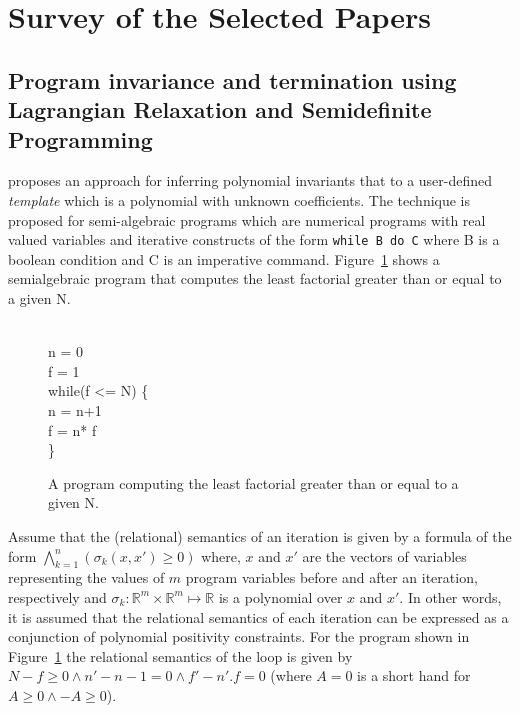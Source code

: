 \newcommand{\real}{\mathbb{R}}
\newcommand{\lmige}{\succcurlyeq}

\section{Survey of the Selected Papers}

\subsection{Program invariance and termination using Lagrangian Relaxation and Semidefinite Programming}

\cite{cousot:VMCAI05} proposes an approach for inferring polynomial invariants that 
to a user-defined \emph{template} which is a polynomial with unknown coefficients.
The technique is proposed for semi-algebraic programs which are numerical programs with real valued variables 
and iterative constructs of the form \texttt{while B do C} where B is a boolean condition 
and C is an imperative command. Figure~\ref{fig:SAprogram} shows a semialgebraic program that computes the least factorial greater than or equal to a given N.
%
\begin{figure}
\begin{myprogram}
\\
\pnl \>  n = 0 \\
\pnl \> f = 1 \\
\pnl \> while(f <= N) \{ \\
\pnl \> \> n = n+1 \\
\pnl \> \> f = n* f \\
\pnl \> \}
\end{myprogram}
\caption{A program computing the least factorial greater than or equal to a given N.} \label{fig:SAprogram}
\end{figure}
%
Assume that the (relational) semantics of an iteration is given by a formula of the form
$\bigwedge \limits_{k=1}^{n} (\sigma_k(x,x') \ge 0)$ where, $x$ and $x'$ are the vectors of
variables representing the values of $m$ program variables before and after an iteration, respectively 
and $\sigma_k : \real^m \times \real^m \mapsto \real$ is a polynomial over $x$ and $x'$. 
In other words, it is assumed that the relational semantics of each
iteration can be expressed as a conjunction of polynomial positivity constraints.
For the program shown in Figure~\ref{fig:SAprogram} the relational semantics of the 
loop is given by $N-f \ge 0 \wedge n' -n -1 = 0 \wedge f' - n'.f = 0$ (where 
$A = 0$ is a short hand for $A \ge 0 \wedge -A \ge 0$).

